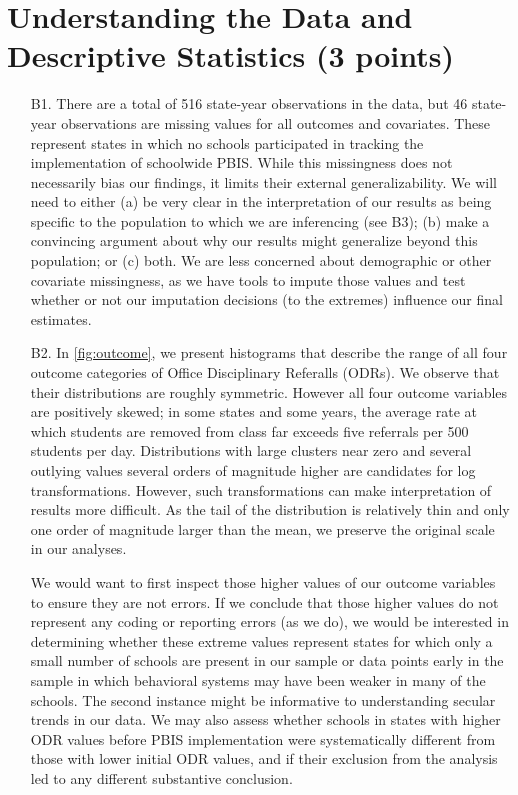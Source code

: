 \documentclass[a4paper, 11pt]{article}
\begin{document}
\section{Understanding the Data and Descriptive Statistics (3 points)}
\begin{enumerate}
	\item[B1.] There are a total of 516 state-year observations in the data, but 46 state-year observations are missing values for all outcomes and covariates. These represent states in which no schools participated in tracking the implementation of schoolwide PBIS. While this missingness does not necessarily bias our findings, it limits their external generalizability. We will need to either (a) be very clear in the interpretation of our results as being specific to the population to which we are inferencing (see B3); (b) make a convincing argument about why our results might generalize beyond this population; or (c) both. We are less concerned about demographic or other covariate missingness, as we have tools to impute those values and test whether or not our imputation decisions (to the extremes) influence our final estimates. 
	\item [B2.] In \autoref{fig:outcome}, we present histograms that describe the range of all four outcome categories of Office Disciplinary Referalls (ODRs). We observe that their distributions are roughly symmetric. However all four outcome variables are positively skewed; in some states and some years, the average rate at which students are removed from class far exceeds five referrals per 500 students per day. Distributions with large clusters near zero and several outlying values several orders of magnitude higher are candidates for log transformations. However, such transformations can make interpretation of results more difficult. As the tail of the distribution is relatively thin and only one order of magnitude larger than the mean, we preserve the original scale in our analyses.

	We would want to first inspect those higher values of our outcome variables to ensure they are not errors. If we conclude that those higher values do not represent any coding or reporting errors (as we do), we would be interested in determining whether these extreme values represent states for which only a small number of schools are present in our sample or data points early in the sample in which behavioral systems may have been weaker in many of the schools. The second instance might be informative to understanding secular trends in our data. We may also assess whether schools in states with higher ODR values before PBIS implementation were systematically different from those with lower initial ODR values, and if their exclusion from the analysis led to any different substantive conclusion. 


\end{enumerate}
\end{document}
